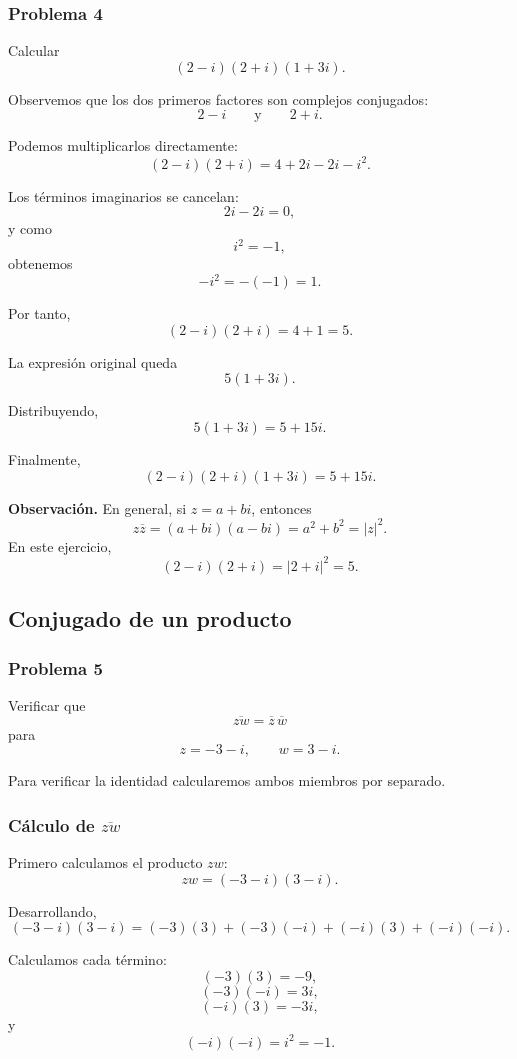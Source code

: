 \documentclass[12pt]{article}
\begin{document}
\subsubsection*{Problema 4}

Calcular
\[
(2-i)(2+i)(1+3i).
\]

Observemos que los dos primeros factores son complejos conjugados:
\[
2-i
\qquad\text{y}\qquad
2+i.
\]

Podemos multiplicarlos directamente:
\[
(2-i)(2+i)
=
4+2i-2i-i^2.
\]

Los términos imaginarios se cancelan:
\[
2i-2i=0,
\]
y como
\[
i^2=-1,
\]
obtenemos
\[
-i^2=-(-1)=1.
\]

Por tanto,
\[
(2-i)(2+i)=4+1=5.
\]

La expresión original queda
\[
5(1+3i).
\]

Distribuyendo,
\[
5(1+3i)=5+15i.
\]

Finalmente,
\[
\boxed{
(2-i)(2+i)(1+3i)=5+15i
}.
\]

\medskip

\noindent
\textbf{Observación.}
En general, si $z=a+bi$, entonces
\[
z\overline z=(a+bi)(a-bi)=a^2+b^2=|z|^2.
\]
En este ejercicio,
\[
(2-i)(2+i)=|2+i|^2=5.
\]

\subsection{Conjugado de un producto}

\subsubsection*{Problema 5}

Verificar que
\[
\overline{zw}=\overline z\,\overline w
\]
para
\[
z=-3-i,
\qquad
w=3-i.
\]

Para verificar la identidad calcularemos ambos miembros por separado.

\subsubsection*{Cálculo de $\overline{zw}$}

Primero calculamos el producto $zw$:
\[
zw=(-3-i)(3-i).
\]

Desarrollando,
\[
(-3-i)(3-i)
=
(-3)(3)+(-3)(-i)+(-i)(3)+(-i)(-i).
\]

Calculamos cada término:
\[
(-3)(3)=-9,
\]
\[
(-3)(-i)=3i,
\]
\[
(-i)(3)=-3i,
\]
y
\[
(-i)(-i)=i^2=-1.
\]
\end{document}
